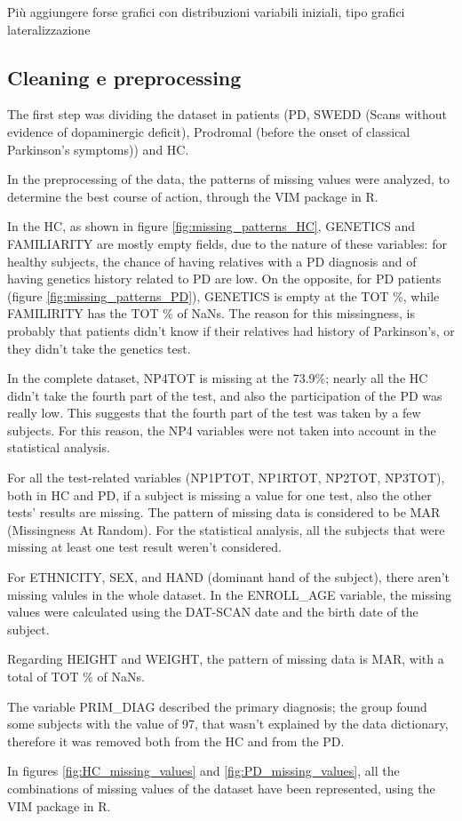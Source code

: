 \documentclass[]{article}
\begin{document}
\begin{multicols}{2}
Più aggiungere forse grafici con distribuzioni variabili iniziali, tipo grafici lateralizzazione

\subsection{Cleaning e preprocessing}

The first step was dividing the dataset in patients (PD, SWEDD (Scans without evidence of dopaminergic deficit), Prodromal (before the onset of classical Parkinson's symptoms)) and HC.

In the preprocessing of the data, the patterns of missing values were analyzed, to determine the best course of action, through the VIM package in R.

In the HC, as shown in figure \ref{fig:missing_patterns_HC}, GENETICS and FAMILIARITY are mostly empty fields, due to the nature of these variables: for healthy subjects, the chance of having relatives with a PD diagnosis and of having genetics history related to PD are low. On the opposite, for PD patients (figure \ref{fig:missing_patterns_PD}), GENETICS is empty at the TOT \%, while FAMILIRITY has the TOT \% of NaNs. The reason for this missingness, is probably that patients didn't know if their relatives had history of Parkinson's, or they didn't take the genetics test. 

In the complete dataset, NP4TOT is missing at the 73.9\%; nearly all the HC didn't take the fourth part of the test, and also the participation of the PD was really low. This suggests that the fourth part of the test was taken by a few subjects. For this reason, the NP4 variables were not taken into account in the statistical analysis.

For all the test-related variables (NP1PTOT, NP1RTOT, NP2TOT, NP3TOT), both in HC and PD, if a subject is missing a value for one test, also the other tests' results are missing. The pattern of missing data is considered to be MAR (Missingness At Random). For the statistical analysis, all the subjects that were missing at least one test result weren't considered.  

For ETHNICITY, SEX, and HAND (dominant hand of the subject), there aren't missing valules in the whole dataset. In the ENROLL\_AGE variable, the missing values were calculated using the DAT-SCAN date and the birth date of the subject.

Regarding HEIGHT and WEIGHT, the pattern of missing data is MAR, with a total of TOT \% of NaNs. 

The variable PRIM\_DIAG described the primary diagnosis; the group found some subjects with the value of 97, that wasn't explained by the data dictionary, therefore it was removed both from the HC and from the PD. 

In figures \ref{fig:HC_missing_values} and \ref{fig:PD_missing_values}, all the combinations of missing values of the dataset have been represented, using the VIM package in R.


\end{multicols}
\end{document}
